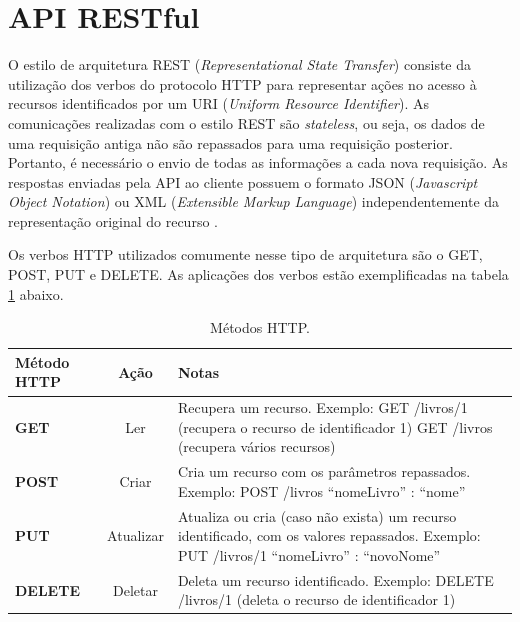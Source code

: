 \section{API RESTful}
O estilo de arquitetura REST (\textit{Representational State Transfer}) consiste da utilização dos verbos do protocolo HTTP para representar ações no acesso à recursos identificados por um URI (\textit{Uniform Resource Identifier}). As comunicações realizadas com o estilo REST são \textit{stateless}, ou seja, os dados de uma requisição antiga não são repassados para uma requisição posterior. Portanto, é necessário o envio de todas as informações a cada nova requisição. As respostas enviadas pela API ao cliente possuem o formato JSON (\textit{Javascript Object Notation}) ou XML (\textit{Extensible Markup Language}) independentemente da representação original do recurso \cite{arcuri2017restful, fielding2000architectural}.

Os verbos HTTP utilizados comumente nesse tipo de arquitetura são o GET, POST, PUT e DELETE. As aplicações dos verbos estão exemplificadas na tabela \ref{tab:httpverbs} abaixo.

\begin{table}[!htb]
	\centering
	\caption{\label{tab:httpverbs} Métodos HTTP.}
	\begin{adjustbox}{max width=\textwidth}
		\begin{tabular}{@{} p{4cm} c p{10cm} @{}}
		\toprule
		\textbf{Método HTTP} & \textbf{Ação} & \textbf{Notas} \\ \hline

		\textbf{GET} &
			Ler & Recupera um recurso. \newline Exemplo: GET /livros/1 (recupera o recurso de identificador 1) \newline GET /livros (recupera vários recursos) \\ \hline

		\textbf{POST} & Criar & Cria um recurso com os parâmetros repassados. \newline Exemplo: POST /livros {“nomeLivro” : “nome”} 
\\ \hline

		\textbf{PUT} & Atualizar & Atualiza ou cria (caso não exista) um recurso identificado, com os valores repassados. \newline Exemplo: PUT /livros/1 {“nomeLivro” : “novoNome”}
\\ \hline

		\textbf{DELETE} & Deletar & Deleta um recurso identificado. \newline Exemplo: DELETE /livros/1 (deleta o recurso de identificador 1)
 \\ \bottomrule
	\end{tabular}
	\end{adjustbox}
\end{table}

